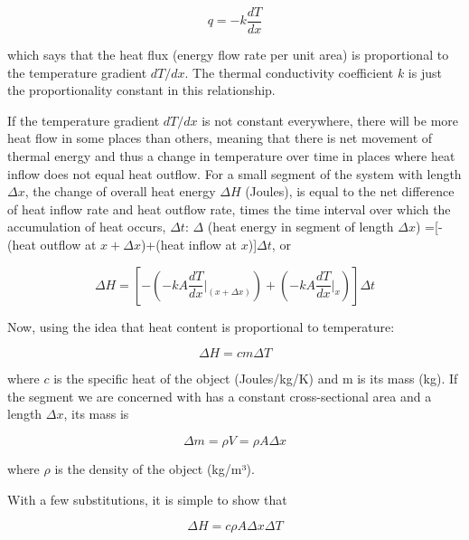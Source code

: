 \begin{equation} \label{eq:heatflux} 
q =-k\frac{dT}{dx}
\end{equation}

which says that the heat flux (energy flow rate per unit area) is proportional to the temperature gradient $dT/dx$.  The thermal conductivity coefficient $k$ is just the proportionality constant in this relationship.

If the temperature gradient $dT/dx$ is not constant everywhere, there will be more heat flow in some places than others, meaning that there is net movement of thermal energy and thus a change in temperature over time in places where heat inflow does not equal heat outflow.  For a small segment of the system with length $\Delta x$, the change of overall heat energy $\Delta H$ (Joules), is equal to the net difference of heat inflow rate and heat outflow rate, times the time interval over which the accumulation of heat occurs, $\Delta t$:
$\Delta$ (heat energy in segment of length $\Delta x$) =[-(heat outflow at $x+\Delta x$)+(heat inflow at $x$)]$\Delta t$, or

\begin{equation} \label{eq:deltah} 
\Delta H =\left[-\left(-kA \frac{dT}{dx}\bigg\rvert_{(x+\Delta x)}\right)+\left( -kA \frac{dT}{dx}\bigg\rvert_{x}\right)\right]\Delta t
\end{equation}

Now, using the idea that heat content is proportional to temperature: 

\begin{equation} \label{eq:heattransfer} 
\Delta H =cm\Delta T
\end{equation}

where $c$ is the specific heat of the object (Joules/kg/K) and m is its mass (kg).  If the segment we are concerned with has a constant cross-sectional area and a length $\Delta x$, its mass is 
	
\begin{equation} \label{eq:mass} 
\Delta m=\rho V = \rho A \Delta x
\end{equation}

where $\rho$ is the density of the object (kg/m³).

With a few substitutions, it is simple to show that 	

\begin{equation} \label{eq:deltaH2} 
\Delta H =c\rho A\Delta x \Delta T
\end{equation}



